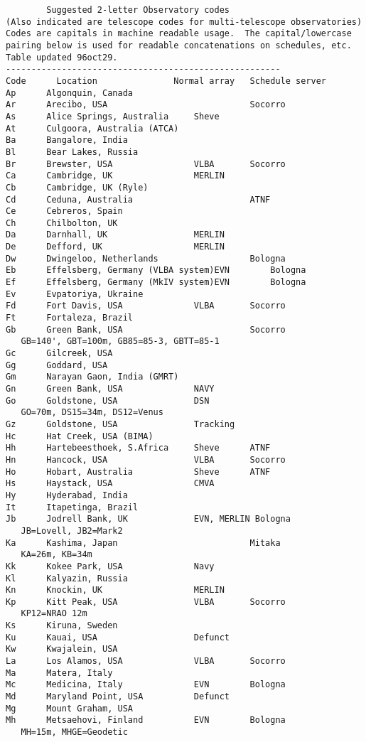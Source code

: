 \documentclass{report}
\begin{document}
\begin{verbatim}
        Suggested 2-letter Observatory codes
(Also indicated are telescope codes for multi-telescope observatories)
Codes are capitals in machine readable usage.  The capital/lowercase
pairing below is used for readable concatenations on schedules, etc.
Table updated 96oct29.
------------------------------------------------------
Code      Location               Normal array   Schedule server
Ap      Algonquin, Canada
Ar      Arecibo, USA                            Socorro
As      Alice Springs, Australia     Sheve
At      Culgoora, Australia (ATCA)
Ba      Bangalore, India
Bl      Bear Lakes, Russia
Br      Brewster, USA                VLBA       Socorro
Ca      Cambridge, UK                MERLIN
Cb      Cambridge, UK (Ryle)
Cd      Ceduna, Australia                       ATNF
Ce      Cebreros, Spain
Ch      Chilbolton, UK
Da      Darnhall, UK                 MERLIN
De      Defford, UK                  MERLIN
Dw      Dwingeloo, Netherlands                  Bologna
Eb      Effelsberg, Germany (VLBA system)EVN        Bologna
Ef      Effelsberg, Germany (MkIV system)EVN        Bologna
Ev      Evpatoriya, Ukraine
Fd      Fort Davis, USA              VLBA       Socorro
Ft      Fortaleza, Brazil
Gb      Green Bank, USA                         Socorro
   GB=140', GBT=100m, GB85=85-3, GBTT=85-1
Gc      Gilcreek, USA
Gg      Goddard, USA
Gm      Narayan Gaon, India (GMRT)
Gn      Green Bank, USA              NAVY
Go      Goldstone, USA               DSN
   GO=70m, DS15=34m, DS12=Venus
Gz      Goldstone, USA               Tracking
Hc      Hat Creek, USA (BIMA)
Hh      Hartebeesthoek, S.Africa     Sheve      ATNF
Hn      Hancock, USA                 VLBA       Socorro
Ho      Hobart, Australia            Sheve      ATNF
Hs      Haystack, USA                CMVA
Hy      Hyderabad, India
It      Itapetinga, Brazil
Jb      Jodrell Bank, UK             EVN, MERLIN Bologna
   JB=Lovell, JB2=Mark2
Ka      Kashima, Japan                          Mitaka
   KA=26m, KB=34m
Kk      Kokee Park, USA              Navy
Kl      Kalyazin, Russia
Kn      Knockin, UK                  MERLIN
Kp      Kitt Peak, USA               VLBA       Socorro
   KP12=NRAO 12m
Ks      Kiruna, Sweden
Ku      Kauai, USA                   Defunct
Kw      Kwajalein, USA
La      Los Alamos, USA              VLBA       Socorro
Ma      Matera, Italy
Mc      Medicina, Italy              EVN        Bologna
Md      Maryland Point, USA          Defunct
Mg      Mount Graham, USA
Mh      Metsaehovi, Finland          EVN        Bologna
   MH=15m, MHGE=Geodetic

\end{verbatim}
\end{document}
